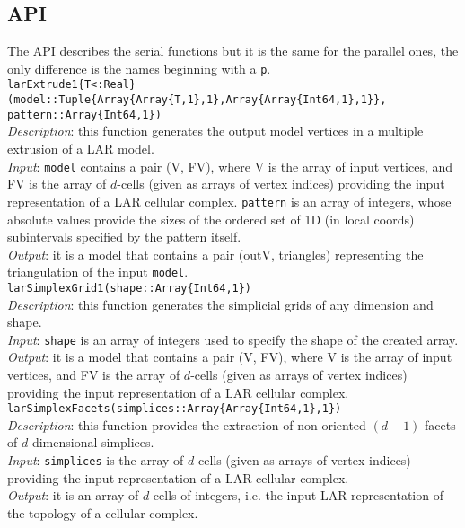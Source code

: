 \documentclass[a4paper,12pt,titlepage]{article}					%
\begin{document}
\subsection{API} %
The API describes the serial functions but it is the same for the parallel ones, the only difference is the names beginning with a \texttt{p}.\\

\texttt{larExtrude1\{T<:Real\}(model::Tuple\{Array\{Array\{T,1\},1\},Array\{Array\{Int64,1\},1\}\},\\pattern::Array\{Int64,1\})}
\\
\emph{Description}: this function generates the output model vertices in a multiple extrusion of a LAR model.
\\
\emph{Input}: \texttt{model} contains a pair (V, FV), where V is the array of input vertices, and FV is the array of $d$-cells (given as arrays of vertex indices) providing the input representation of a LAR cellular complex.
\texttt{pattern} is an array of integers, whose absolute values provide the sizes of the ordered set of 1D (in local coords) subintervals specified by the pattern itself.
\\
\emph{Output}: it is a model that contains a pair (outV, triangles) representing the triangulation of the input \texttt{model}.
\\

\texttt{larSimplexGrid1(shape::Array\{Int64,1\})}
\\
\emph{Description}: this function generates the simplicial grids of any dimension and shape.
\\
\emph{Input}: \texttt{shape} is an array of integers used to specify the shape of the created array.
\\
\emph{Output}: it is a model that contains a pair (V, FV), where V is the array of input vertices, and FV is the array of $d$-cells (given as arrays of vertex indices) providing the input representation of a LAR cellular complex.
\\

\texttt{larSimplexFacets(simplices::Array\{Array\{Int64,1\},1\})}
\\
\emph{Description}: this function provides the extraction of non-oriented $(d-1)$-facets of $d$-dimensional simplices.
\\
\emph{Input}: \texttt{simplices} is the array of $d$-cells (given as arrays of vertex indices) providing the input representation of a LAR cellular complex.
\\
\emph{Output}: it is an array of $d$-cells of integers, i.e. the input LAR representation of the topology of a cellular complex.
\\
\end{document}
